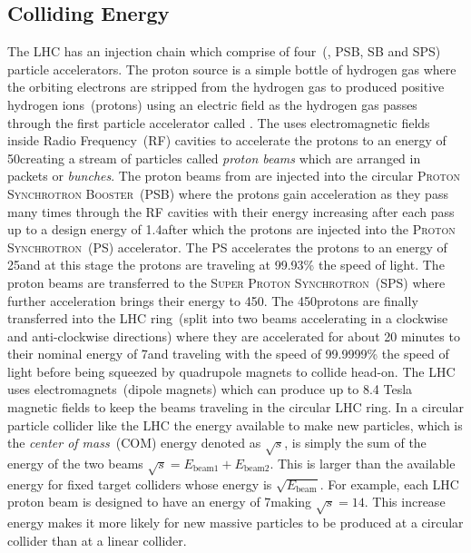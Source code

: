 \subsection{Colliding Energy}
The LHC has an injection chain which comprise of four~(\linac, PSB, SB and SPS) particle accelerators. The proton source is a simple bottle of hydrogen gas where the orbiting electrons are stripped from the hydrogen gas to produced positive hydrogen ions~(protons) using an electric field as the hydrogen gas passes through the first particle accelerator called \linac. The \linac uses electromagnetic fields inside Radio Frequency~(RF) cavities to accelerate the protons to an energy of 50\MeV creating a stream of particles called \textit{proton beams} which are arranged in packets or \textit{bunches}. The proton beams from \linac are injected into the circular \textsc{Proton Synchrotron Booster}~(PSB) where the protons gain acceleration as they pass many times through the RF cavities with their energy increasing after each pass up to a design energy of 1.4\GeV after which the protons are injected into the \textsc{Proton Synchrotron}~(PS) accelerator. The PS accelerates the protons to an energy of 25\GeV and at this stage the protons are traveling at 99.93\% the speed of light. The proton beams are transferred to the \textsc{Super Proton Synchrotron}~(SPS) where further acceleration brings their energy to 450\GeV. The 450\GeV protons are finally transferred into the LHC ring~(split into two beams accelerating in a clockwise and anti-clockwise directions) where they are accelerated for about 20 minutes to their nominal energy of 7\TeV and traveling with the speed of 99.9999\% the speed of light before being squeezed by quadrupole magnets to collide head-on. The LHC uses electromagnets~(dipole magnets) which can produce up to 8.4 Tesla magnetic fields to keep the beams traveling in the circular LHC ring.
\newline
In a circular particle collider like the LHC the energy available to make new particles, which is the \textit{center of mass}~(COM) energy denoted as $\sqrt{s}$, is simply the sum of the energy of the two beams \ie $\sqrt{s} = \mathit{E}_{\mbox{beam1}} + \mathit{E}_{\mbox{beam2}}$. This is larger than the available energy for fixed target colliders whose energy is $\sqrt{\mathit{E}_{\mbox{beam}}}$. For example,  each LHC proton beam is designed to have an energy of 7\TeV  making $\sqrt{s} = 14$\TeV. This increase energy  makes it more likely for new massive particles to be produced at a circular collider than at a linear collider. 

